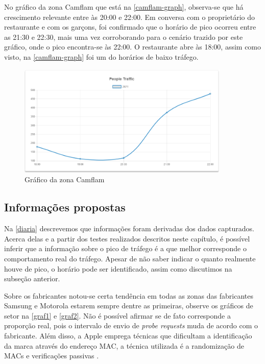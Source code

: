 No gráfico da zona Camflam que está na \autoref{camflam-graph}, observa-se que
há crescimento relevante entre às 20:00 e 22:00. Em conversa com o proprietário
do restaurante e com os garçons, foi confirmado que o horário de pico ocorreu
entre as 21:30 e 22:30, mais uma vez corroborando para o cenário trazido por este
gráfico, onde o pico encontra-se às 22:00. O restaurante abre às 18:00, assim como visto,
na \autoref{camflam-graph} foi um do horários de baixo tráfego.


\begin{figure}[!h]
  \caption{\label{camflam-graph}Gráfico da zona Camflam}
  \begin{center}
    \includegraphics[width=0.90\textwidth]{img/camflam-graph.png}
  \end{center}
\end{figure}

\subsection{Informações propostas}
Na \autoref{diaria} descrevemos que informações foram derivadas dos dados capturados. Acerca delas e a partir
dos testes realizados descritos neste capítulo, é possível inferir que a informação sobre o pico de tráfego
é a que melhor corresponde o comportamento real do tráfego. Apesar de não saber indicar o quanto realmente houve de pico, o
horário pode ser identificado, assim como discutimos na subseção anterior.

Sobre os fabricantes notou-se certa tendência em todas as zonas das fabricantes Samsung e Motorola estarem
sempre dentre as primeiras, observe os gráficos de setor na \autoref{graf1} e \autoref{graf2}. Não é possível afirmar se de fato corresponde a proporção real, pois o intervalo de envio
de \emph{probe requests} muda de acordo com o fabricante. Além disso, a Apple emprega técnicas que dificultam
a identificação da marca através do endereço MAC, a técnica utilizada é a randomização de MACs e verificações passivas \cite{Apple2016}.

